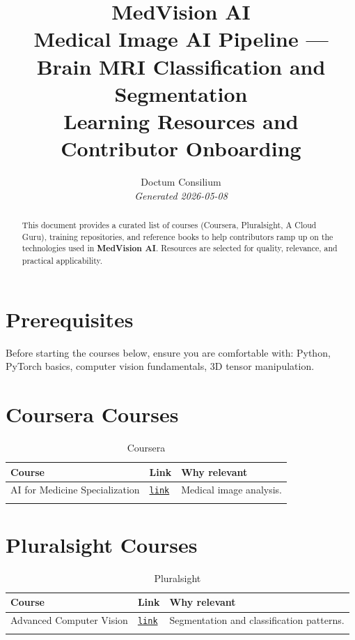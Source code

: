 \documentclass[11pt,a4paper]{article}
\begin{document}
\title{
  \textcolor{doctum}{\Large\textbf{MedVision AI}} \\[0.5em]
  \large Medical Image AI Pipeline — Brain MRI Classification and Segmentation \\[0.3em]
  \normalsize Learning Resources and Contributor Onboarding
}
\author{Doctum Consilium \\ \small\textit{Generated 2026-05-08}}
\date{}
\maketitle
\thispagestyle{fancy}

\begin{abstract}
This document provides a curated list of courses (Coursera, Pluralsight, A Cloud Guru),
training repositories, and reference books to help contributors ramp up on the
technologies used in \textbf{MedVision AI}.
Resources are selected for quality, relevance, and practical applicability.
\end{abstract}

\tableofcontents
\newpage

\section{Prerequisites}
Before starting the courses below, ensure you are comfortable with:
Python, PyTorch basics, computer vision fundamentals, 3D tensor manipulation.

\section{Coursera Courses}
\begin{longtable}{p{6cm} p{1.5cm} p{7cm}}
\toprule
\textbf{Course} & \textbf{Link} & \textbf{Why relevant} \\
\midrule
\endhead
  AI for Medicine Specialization & \href{https://www.coursera.org/specializations/ai-for-medicine}{\texttt{link}} & Medical image analysis. \\
\bottomrule
\caption{Coursera}
\end{longtable}


\section{Pluralsight Courses}
\begin{longtable}{p{6cm} p{1.5cm} p{7cm}}
\toprule
\textbf{Course} & \textbf{Link} & \textbf{Why relevant} \\
\midrule
\endhead
  Advanced Computer Vision & \href{https://www.pluralsight.com/courses/advanced-computer-vision}{\texttt{link}} & Segmentation and classification patterns. \\
\bottomrule
\caption{Pluralsight}
\end{longtable}
\end{document}
